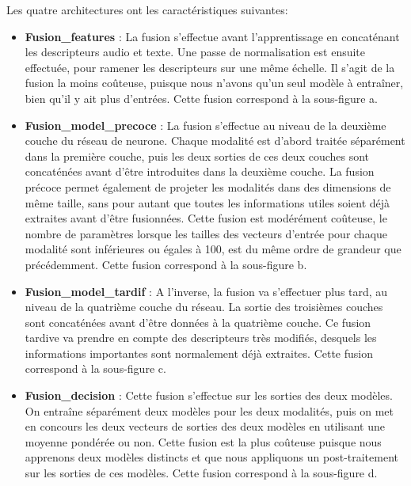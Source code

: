 Les quatre architectures ont les caractéristiques suivantes:
\begin{itemize}
  \item \textbf{Fusion\_features} : La fusion s'effectue avant l'apprentissage en concaténant les descripteurs audio et texte. Une passe de normalisation est ensuite effectuée, pour ramener les descripteurs sur une même échelle. Il s'agit de la fusion la moins coûteuse, puisque nous n'avons qu'un seul modèle à entraîner, bien qu'il y ait plus d'entrées. Cette fusion correspond à la sous-figure a.
  \item \textbf{Fusion\_model\_precoce} : La fusion s'effectue  au niveau de la deuxième couche du réseau de neurone. Chaque modalité est d'abord traitée séparément dans la première couche, puis les deux sorties de ces deux couches sont concaténées avant d'être introduites dans la deuxième couche. La fusion précoce permet également de projeter les modalités dans des dimensions de même taille, sans pour autant que toutes les informations utiles soient déjà extraites avant d'être fusionnées. Cette fusion est modérément coûteuse, le nombre de paramètres lorsque les tailles des vecteurs d'entrée pour chaque modalité sont inférieures ou égales à 100, est du même ordre de grandeur que précédemment. Cette fusion correspond à la sous-figure b.
  \item \textbf{Fusion\_model\_tardif} : A l'inverse, la fusion va s'effectuer plus tard, au niveau de la quatrième couche du réseau. La sortie des troisièmes couches sont concaténées avant d'être données à la quatrième couche. Ce fusion tardive va prendre en compte des descripteurs très modifiés, desquels les informations importantes sont normalement déjà extraites. Cette fusion correspond à la sous-figure c.
  \item \textbf{Fusion\_decision} : Cette fusion s'effectue sur les sorties des deux modèles. On entraîne séparément deux modèles pour les deux modalités, puis on met en concours les deux vecteurs de sorties des deux modèles en utilisant une moyenne pondérée ou non. Cette fusion est la plus coûteuse puisque nous apprenons deux modèles distincts et que nous appliquons un post-traitement sur les sorties de ces modèles. Cette fusion correspond à la sous-figure d.
\end{itemize}

